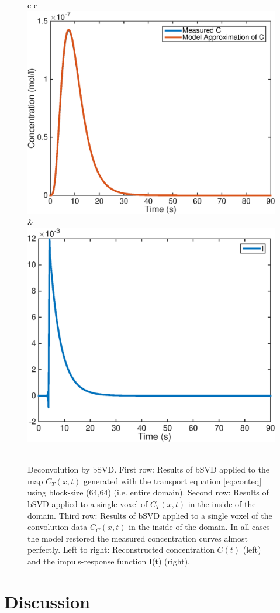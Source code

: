 \documentclass[paper=a4, fontsize=11pt,parskip=half,headings=small]{scrartcl}
\begin{document}
\begin{figure}[H]
\begin{tabular}{c c}
				  \\				 
				 \includegraphics[width = .45\textwidth]{./figs/C-and-Crec-conv.eps} & \includegraphics[width = .45\textwidth]{./figs/Irec-conv.eps} \\			 
				  \\				 				 
			\end{tabular}
		\caption{Deconvolution by bSVD. First row: Results of bSVD applied to the map $C_T(x,t)$ generated with the transport equation \eqref{eq:conteq} using block-size (64,64) (i.e. entire domain). Second row: Results of bSVD applied to a single voxel of $C_T(x,t)$ in the inside of the domain. Third row: Results of bSVD applied to a single voxel of the convolution data $C_C(x,t)$ in the inside of the domain. In all cases the model restored the measured concentration curves almost perfectly. Left to right: Reconstructed concentration $C(t)$ (left) and the impuls-response function I(t) (right).}			
		\label{fig:deconvResults}
	\end{figure}

	
	
	\section{Discussion}\label{sec:conclusion}
	
\end{document}
